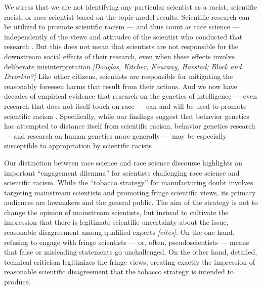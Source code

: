 \documentclass[12pt]{article}
\begin{document}
We stress that we are not identifying any particular scientist as a racist, scientific racist, or race scientist based on the topic model results. Scientific research can be utilized to promote scientific racism --- and thus count as race science --- independently of the views and attitudes of the scientist who conducted that research \cite{TaberyWhyStudyingGenetics2015, GillbornSoftlySoftlyGenetics2016, CarlsonQuantifyingContextualizingImpact2020, HennWhyDNANo2021}. But this does not mean that scientists are not responsible for the downstream social effects of their
research, even when these effects involve deliberate misinterpretation.\emph{{[}Douglas, Kitcher, Kourany, Havstad; Block and Dworkin?{]}} Like other citizens, scientists are responsible for mitigating the reasonably foreseen harms that result from their actions. And we now have decades of empirical evidence that research on the genetics of intelligence --- even research that does not itself touch on race --- can and will be used to promote scientific racism \cite{MeyerWrestlingSocialBehavioral2023}. Specifically, while our findings suggest that behavior genetics has attempted to distance itself from scientific racism, behavior genetics research --- and research on human genetics more generally --- may be especially susceptible to appropriation by scientific racists \cite{CarlsonQuantifyingContextualizingImpact2020, OgbunugaforDNABasketballBirthday2022, *[Harden reviews]*}.

Our distinction between race science and race science discourse highlights an important ``engagement dilemma'' for scientists challenging race science and scientific racism. While the ``tobacco strategy'' for manufacturing doubt involves targeting mainstream scientists and promoting fringe scientific views, its primary audiences are lawmakers and the general public. The aim of the strategy is not to change the opinion of mainstream scientists, but instead to cultivate the impression that there is legitimate scientific uncertainty about the issue, reasonable disagreement among qualified experts \emph{{[}cites{]}}. On the one hand, refusing to engage with fringe scientists --- or, often, pseudoscientists \cite{BhakthavatsalamVirtueEpistemologicalApproach2021} --- means that false or misleading statements go unchallenged. On the other hand, detailed, technical criticism legitimizes the fringe views, creating exactly the impression of reasonable scientific disagreement that the tobacco strategy is intended to produce.
\end{document}
